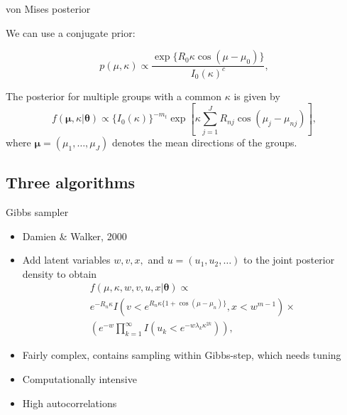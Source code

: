 \documentclass{beamer}
\begin{document}
\begin{frame}{von Mises posterior}	

We can use a conjugate prior:

$$ p(\mu, \kappa) \propto \frac{\exp\{R_0 \kappa \cos (\mu - \mu_0)\}  } {I_0 (\kappa) ^{c}} ,$$

The posterior for multiple groups with a common $\kappa$ is given by $$f(\boldsymbol{\mu}, \kappa \vert \boldsymbol\theta) \propto \{I_0 (\kappa) \}^{-m_t} \exp \left[ \kappa \sum_{j=1}^{J} R_{nj} \cos (\mu_j - \mu_{nj})\right], $$ where $\boldsymbol{\mu} = (\mu_{1}, \dots, \mu_{J})$ denotes the mean directions of the groups. 
\end{frame}



\subsection{Three algorithms}

\begin{frame}{Gibbs sampler} 
\begin{itemize}
\item Damien \& Walker, 2000 
\item Add latent variables $w, v, x,$ and $u=(u_1, u_2, \dots)$ to the joint posterior density to obtain
\begin{multline*}
 f (\mu, \kappa, w, v, u, x \vert \boldsymbol\theta)  \propto \\
 e^{-R_n \kappa} I(v < e^{R_{n} \kappa \{1+\cos(\mu - \mu_n)\}}, x < w^{m-1}) \times \\ 
 \left( e^{-w} \prod_{k=1}^{\infty} I(u_k < e^{-w\lambda_k\kappa^{2k}}) \right),
 \end{multline*}
\item Fairly complex, contains sampling within Gibbs-step, which needs tuning
\item Computationally intensive
\item High autocorrelations
\end{itemize}
\end{frame}
\end{document}

